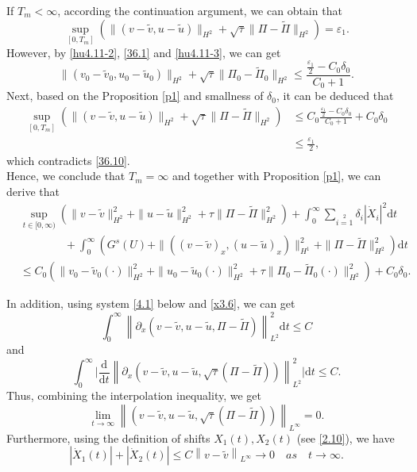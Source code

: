 \documentclass[10pt,reqno]{amsart}
\numberwithin{equation}{section}
\newcommand{\dif}{\mathrm{d}}
\begin{document}
If $T_m<\infty$, according the continuation argument, we can obtain that
\begin{equation}\label{36.10}
\sup\limits_{[0, T_m]}\left(\|(v-\widetilde{v},u-\widetilde{u})\|_{H^2}
+\sqrt{\tau}\|\Pi-\widetilde{\Pi}\|_{H^2}\right)=\varepsilon_1.
\end{equation}
However, by \eqref{hu4.11-2}, \eqref{36.1} and \eqref{hu4.11-3}, we can get
\begin{equation}\label{36.11}
\|(v_0-\widetilde{v}_0,u_0-\widetilde{u}_0)\|_{H^2}
+\sqrt{\tau}\|\Pi_0-\widetilde{\Pi}_0\|_{H^2}\le \frac{\frac{\varepsilon_1}{2}-C_0\delta_0}{C_0+1}.
\end{equation}
Next, based on the Proposition \ref{p1} and smallness of $\delta_0$, it can be deduced that
\begin{equation}\label{36.100}
\begin{aligned}
\sup\limits_{[0, T_m]}\left(\|(v-\widetilde{v},u-\widetilde{u})\|_{H^2}
+\sqrt{\tau}\|\Pi-\widetilde{\Pi}\|_{H^2}\right)&\le C_0\frac{\frac{\varepsilon_1}{2}-C_0\delta_0}{C_0+1}+C_0\delta_0\\
&\le \frac{\varepsilon_1}{2},
\end{aligned}
\end{equation}
which contradicts \eqref{36.10}.\\
Hence, we conclude that $T_m=\infty$ and together with Proposition \ref{p1}, we can derive that
\begin{equation}\label{x3.6}
\begin{aligned}
&\sup\limits_{t\in[0,\infty)}\left(\|v-\widetilde{v}\|^2_{H^2}
+\|u-\widetilde{u}\|^2_{H^2}+\tau\|\Pi-\widetilde{\Pi}\|^2_{H^2}\right)
+\int_0^\infty\sum\limits_{i=1}\limits^2\delta_i|\dot{X}_i|^2\dif t\\
&\qquad\qquad+\int_0^\infty\left(G^s(U)
+\|\left((v-\widetilde{v})_{x}, (u-\widetilde{u})_{x}\right)\|^2_{H^1}+\|\Pi-\widetilde{\Pi}\|^2_{H^2}\right)\dif t\\
&\leq C_0\left(\|v_0-\widetilde{v}_0(\cdot)\|^2_{H^2}+\|u_0-\widetilde{u}_0(\cdot)\|^2_{H^2}
+\tau\|\Pi_0-\widetilde{\Pi}_0(\cdot)\|^2_{H^2}\right)+C_0\delta_0.
\end{aligned}
\end{equation}


In addition, using system \eqref{4.1} below and \eqref{x3.6}, we can get
$$
\int_0^{\infty}\left\|\partial_{x}(v-\widetilde{v}, u-\widetilde{u}, \Pi-\widetilde{\Pi})\right\|_{L^2}^2\dif t \le C
$$
and
$$\int_0^{\infty} \Big|\frac{\dif}{\dif t}\left\|\partial_{x}(v-\widetilde{v}, u-\widetilde{u}, \sqrt{\tau}(\Pi-\widetilde{\Pi}))\right\|_{L^2}^2 \Big |\dif t \le C.$$
Thus, combining the interpolation inequality, we get
\[
\lim\limits_{t\rightarrow\infty}\left\|(v-\widetilde{v}, u-\widetilde{u}, \sqrt{\tau}(\Pi-\widetilde{\Pi}))\right\|_{L^{\infty}}=0.
\]
Furthermore, using the definition of shifts $X_1(t), X_2(t)$ (see \eqref{2.10}), we have
\begin{equation}\label{3.11}
|\dot{X}_1(t)|+|\dot{X}_2(t)|\leq C\left\|v-\widetilde{v}\right\|_{L^{\infty}}\rightarrow0\quad as \quad t\rightarrow\infty.
\end{equation}
\end{document}
